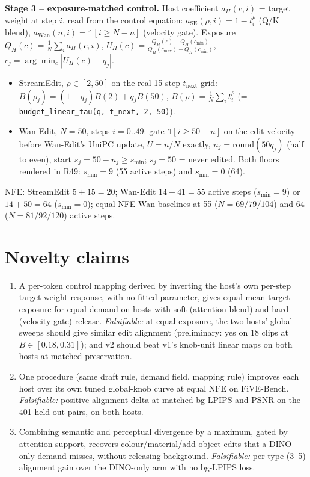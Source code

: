 \documentclass{article}
\begin{document}
\textbf{Stage 3 -- exposure-matched control.} Host coefficient $a_H(c,i)$ = target weight at step $i$, read from the control equation: $a_{\mathrm{SE}}(\rho,i)=1-t_i^{\rho}$ (Q/K blend), $a_{\mathrm{Wan}}(n,i)=\mathbb 1[i\ge N-n]$ (velocity gate). Exposure $Q_H(c)=\frac1N\sum_i a_H(c,i)$, $U_H(c)=\frac{Q_H(c)-Q_H(c_{\min})}{Q_H(c_{\max})-Q_H(c_{\min})}$, $c_j=\arg\min_c|U_H(c)-q_j|$.
\begin{itemize}
\item StreamEdit, $\rho\in[2,50]$ on the real 15-step $t_{\mathrm{next}}$ grid: $B(\rho_j)=(1-q_j)B(2)+q_jB(50)$, $B(\rho)=\frac1N\sum_i t_i^\rho$ (= \texttt{budget\_linear\_tau(q, t\_next, 2, 50)}).
\item Wan-Edit, $N=50$, steps $i=0..49$: gate $\mathbb 1[i\ge 50-n]$ on the edit velocity before Wan-Edit's UniPC update, $U=n/N$ exactly, $n_j=\mathrm{round}(50q_j)$ (half to even), start $s_j=50-n_j\ge s_{\min}$; $s_j=50$ = never edited. Both floors rendered in R49: $s_{\min}=9$ (55 active steps) and $s_{\min}=0$ (64). %
\end{itemize}
NFE: StreamEdit $5+15=20$; Wan-Edit $14+41=55$ active steps ($s_{\min}=9$) or $14+50=64$ ($s_{\min}=0$); equal-NFE Wan baselines at 55 ($N=69/79/104$) and 64 ($N=81/92/120$) active steps.

\section{Novelty claims}
\begin{enumerate}
\item A per-token control mapping derived by inverting the host's own per-step target-weight response, with no fitted parameter, gives equal mean target exposure for equal demand on hosts with soft (attention-blend) and hard (velocity-gate) release. \emph{Falsifiable:} at equal exposure, the two hosts' global sweeps should give similar edit alignment (preliminary: yes on 18 clips at $B\in[0.18,0.31]$); and v2 should beat v1's knob-unit linear maps on both hosts at matched preservation.
\item One procedure (same draft rule, demand field, mapping rule) improves each host over its own tuned global-knob curve at equal NFE on FiVE-Bench. \emph{Falsifiable:} positive alignment delta at matched bg LPIPS and PSNR on the 401 held-out pairs, on both hosts. %
\item Combining semantic and perceptual divergence by a maximum, gated by attention support, recovers colour/material/add-object edits that a DINO-only demand misses, without releasing background. \emph{Falsifiable:} per-type (3--5) alignment gain over the DINO-only arm with no bg-LPIPS loss. %
\end{enumerate}
\end{document}
